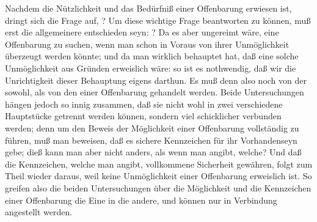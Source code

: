Nachdem die Nützlichkeit und das Bedürfniß einer Offenbarung erwiesen ist, dringt sich die Frage auf, ? Um diese wichtige Frage beantworten zu können, muß erst die allgemeinere entschieden seyn: ? Da es aber ungereimt wäre, eine Offenbarung zu suchen, wenn man schon in Voraus von ihrer Unmöglichkeit überzeugt werden könnte; und da man wirklich behauptet hat, daß eine solche Unmöglichkeit aus Gründen  erweislich wäre: so ist es nothwendig, daß wir die Unrichtigkeit dieser Behauptung eigens darthun. Es muß denn also noch von der  sowohl, als von den  einer Offenbarung gehandelt werden. Beide Untersuchungen hängen jedoch so innig zusammen, daß sie nicht wohl in zwei verschiedene Hauptstücke getrennt werden können, sondern viel schicklicher verbunden werden; denn um den Beweis der Möglichkeit einer Offenbarung vollständig zu führen, muß man beweisen, daß es sichere Kennzeichen für ihr Vorhandenseyn gebe; dieß kann man aber nicht anders, als wenn man angibt, welche? Und daß die Kennzeichen, welche man angibt, vollkommene Sicherheit gewähren, folgt zum Theil wieder daraus, weil keine Unmöglichkeit einer Offenbarung erweislich ist. So greifen also die beiden Untersuchungen über die Möglichkeit und die Kennzeichen einer Offenbarung die Eine in die andere, und können nur in Verbindung angestellt werden.~

